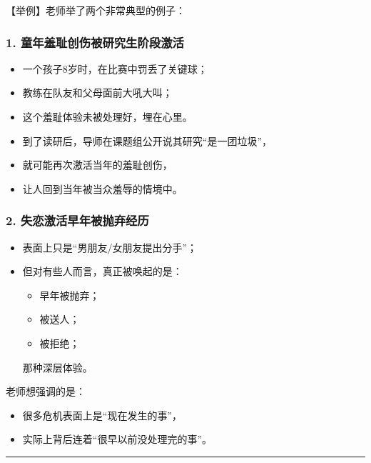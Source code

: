 \documentclass[
  chinese,
  9pt,
  a4paper,
]{ctexart}
\providecommand{\tightlist}{%
  \setlength{\itemsep}{0pt}\setlength{\parskip}{0pt}}
\begin{document}
【举例】老师举了两个非常典型的例子：

\subsubsection{1.
童年羞耻创伤被研究生阶段激活}\label{ux7ae5ux5e74ux7f9eux803bux521bux4f24ux88abux7814ux7a76ux751fux9636ux6bb5ux6fc0ux6d3b}

\begin{itemize}
\tightlist
\item
  一个孩子8岁时，在比赛中罚丢了关键球；
\item
  教练在队友和父母面前大吼大叫；
\item
  这个羞耻体验未被处理好，埋在心里。
\item
  到了读研后，导师在课题组公开说其研究``是一团垃圾''，
\item
  就可能再次激活当年的羞耻创伤，
\item
  让人回到当年被当众羞辱的情境中。
\end{itemize}

\subsubsection{2.
失恋激活早年被抛弃经历}\label{ux5931ux604bux6fc0ux6d3bux65e9ux5e74ux88abux629bux5f03ux7ecfux5386}

\begin{itemize}
\item
  表面上只是``男朋友/女朋友提出分手''；
\item
  但对有些人而言，真正被唤起的是：

  \begin{itemize}
  \tightlist
  \item
    早年被抛弃；
  \item
    被送人；
  \item
    被拒绝；
  \end{itemize}

  那种深层体验。
\end{itemize}

老师想强调的是：

\begin{itemize}
\tightlist
\item
  很多危机表面上是``现在发生的事''，
\item
  实际上背后连着``很早以前没处理完的事''。
\end{itemize}

\begin{center}\rule{0.5\linewidth}{0.5pt}\end{center}
\end{document}
